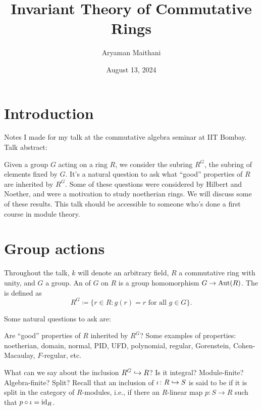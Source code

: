 \documentclass[12pt]{article}
\title{Invariant Theory of Commutative Rings}
\author{Aryaman Maithani}
\date{August 13, 2024}
\begin{document}
\maketitle

\section*{Introduction}

Notes I made for my talk at the commutative algebra seminar at IIT Bombay. Talk abstract: \newline

\begin{blockquote}
	Given a group $G$ acting on a ring $R$, we consider the subring $R^{G}$, the subring of elements fixed by $G$. It's a natural question to ask what ``good'' properties of $R$ are inherited by $R^{G}$. Some of these questions were considered by Hilbert and Noether, and were a motivation to study noetherian rings. We will discuss some of these results. \newline
	This talk should be accessible to someone who's done a first course in module theory.
\end{blockquote}

\section{Group actions}

Throughout the talk, $k$ will denote an arbitrary field, $R$ a commutative ring with unity, and $G$ a group. An  of $G$ on $R$ is a group homomorphism $G \to \operatorname{Aut}(R)$. The  is defined as
\begin{equation*} 
	R^{G} \coloneqq \{r \in R : g(r) = r \text{ for all } g \in G\}.
\end{equation*}

Some natural questions to ask are:

\begin{ques}
	Are ``good'' properties of $R$ inherited by $R^{G}$? \newline
	Some examples of properties: noetherian, domain, normal, PID, UFD, polynomial, regular, Gorenstein, Cohen-Macaulay, $F$-regular, etc.
\end{ques}

\begin{ques}
	What can we say about the inclusion $R^{G} \hookrightarrow R$? \newline
	Is it integral? Module-finite? Algebra-finite? Split? \newline
	Recall that an inclusion of $\iota \colon R \hookrightarrow S$ is said to be  if it is split in the category of $R$-modules, i.e., if there an $R$-linear map $p \colon S \to R$ such that $p \circ \iota = \operatorname{id}_{R}$.
\end{ques}
\end{document}

